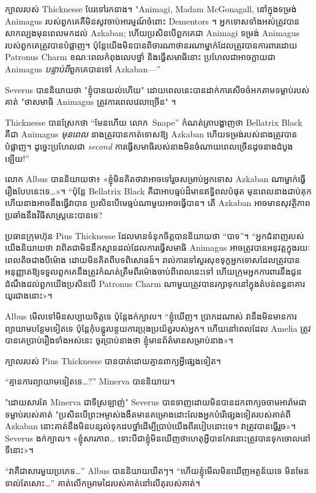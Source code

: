 ក្បាលរបស់ Thicknesse បែរទៅរកនាង។ "Animagi, Madam McGonagall, នៅក្នុងទម្រង់ Animagus របស់ពួកគេគឺមិនសូវចាប់អារម្មណ៍ចំពោះ Dementors ។ អ្នកទោសទាំងអស់ត្រូវបានសាកល្បងមុនពេលមកដល់ Azkaban; ហើយប្រសិនបើពួកគេជា Animagi ទម្រង់ Animagus របស់ពួកគេត្រូវបានបំផ្លាញ។ ប៉ុន្តែយើងមិនបានពិចារណាថានរណាម្នាក់ដែលត្រូវបានការពារដោយ Patronus Charm ខណៈពេលកំពុងលេបថ្នាំ និងធ្វើសមាធិនោះ ប្រហែលជាអាចក្លាយជា Animagus \emph{បន្ទាប់ពី}ពួកគេបានទៅ Azkaban—”

Severus បាននិយាយថា "ខ្ញុំបានយល់ហើយ" ដោយពេលនេះបានដាក់ការសើចចំអកតាមទម្លាប់របស់គាត់ "ថាសមាធិ Animagus ត្រូវការពេលវេលាច្រើន" ។

Thicknesse បានស្រែកថា “មែនហើយ លោក~Snape” កំណត់ត្រាបង្ហាញថា Bellatrix Black គឺជា Animagus \emph{មុនពេល} នាងត្រូវបានកាត់ទោសឱ្យ Azkaban ហើយទម្រង់របស់នាងត្រូវបានបំផ្លាញ។ ដូច្នេះប្រហែលជា \emph{second} ការធ្វើសមាធិរបស់នាងមិនចំណាយពេលច្រើនដូចនាងដំបូងឡើយ!”

លោក Albus បាន​និយាយ​ថា៖ «ខ្ញុំ​មិន​គិត​ថា​វា​អាច​ទៅ​រួច​សម្រាប់​អ្នក​ទោស Azkaban ណា​ម្នាក់​ធ្វើ​រឿង​បែប​នេះ​ទេ…»។ “ប៉ុន្តែ Bellatrix Black គឺជាអាបធ្មប់ដ៏មានឥទ្ធិពលបំផុត មុនពេលនាងជាប់គុក ហើយនាងអាចនឹងធ្វើវាបាន ប្រសិនបើមេធ្មប់ណាមួយអាចធ្វើបាន។ តើ Azkaban អាចមានសុវត្ថិភាពប្រឆាំងនឹងវិធីសាស្រ្តនេះបានទេ?

ប្រធាន​ក្រុមហ៊ុន Pius Thicknesse ដែល​មាន​ទំនុក​ចិត្ត​បាន​និយាយ​ថា “បាទ”។ “អ្នកជំនាញរបស់យើងនិយាយថា វាពិតជាមិននឹកស្មានដល់ដែលការធ្វើសមាធិ Animagus អាចត្រូវបានអនុវត្តក្នុងរយៈពេលតិចជាងបីម៉ោង ដោយមិនគិតពីបទពិសោធន៍។ រាល់ការទៅសួរសុខទុក្ខអ្នកទោសដែលត្រូវបានអនុញ្ញាតឱ្យទទួលពួកគេនឹងត្រូវកំណត់ត្រឹមពីរម៉ោងចាប់ពីពេលនេះទៅ ហើយក្រុមអ្នកការពារនឹងជូនដំណឹងដល់ពួកយើងប្រសិនបើ Patronus Charm ណាមួយត្រូវបានរក្សាទុកនៅក្នុងតំបន់ពន្ធនាគារយូរជាងនោះ»។

Albus មើលទៅមិនសប្បាយចិត្តទេ ប៉ុន្តែងក់ក្បាល។ “ខ្ញុំឃើញ។ ប្រាកដណាស់ វានឹងមិនមានការព្យាយាមបន្ថែមទៀតទេ ប៉ុន្តែកុំបន្ធូរបន្ថយការប្រុងប្រយ័ត្នរបស់អ្នក។ ហើយនៅពេលដែល Amelia ត្រូវបានគេប្រាប់រឿងទាំងអស់នេះ ចូរប្រាប់នាងថា ខ្ញុំមានព័ត៌មានសម្រាប់នាង»។

ក្បាលរបស់ Pius Thicknesse បានបាត់ដោយគ្មានពាក្យអ្វីផ្សេងទៀត។

“គ្មានការព្យាយាមទៀតទេ…?” Minerva បាននិយាយ។

"ដោយសារតែ Minerva ជាទីស្រឡាញ់" Severus បានទាញដោយមិនបានដកពាក្យចចាមអារ៉ាមជាទម្លាប់របស់គាត់ "ប្រសិនបើព្រះអម្ចាស់ងងឹតមានគម្រោងដោះលែងអ្នកបំរើផ្សេងទៀតរបស់គាត់ពី Azkaban នោះគាត់នឹងមិនបន្សល់ទុកដបថ្នាំដើម្បីប្រាប់យើងពីរបៀបនោះទេ។ វា​ត្រូវ​បាន​ធ្វើ​រួច»។ Severus ងក់ក្បាល។ «ខ្ញុំ​សារភាព… ទោះបី​ជា​ខ្ញុំ​មិន​ឃើញ​ថា​ហេតុអ្វី​បាន​កែវ​នោះ​ត្រូវ​បាន​ទុក​ចោល​នៅ​ទី​នោះ»។

“វាគឺជាសារមួយប្រភេទ…” Albus បាននិយាយយឺតៗ។ “ហើយខ្ញុំមើលមិនឃើញអត្ថន័យទេ មិនមែនទាល់តែសោះ…” គាត់លើកម្រាមដៃរបស់គាត់នៅលើតុរបស់គាត់។

